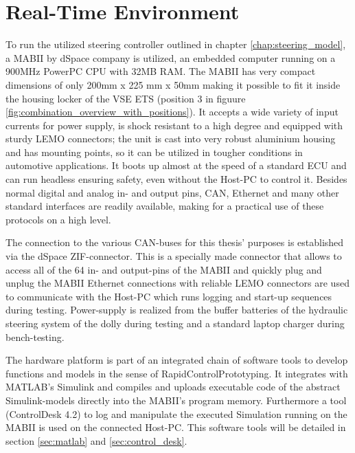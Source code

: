\documentclass[ExampleMasters.tex]{subfiles}
\begin{document}
\section{Real-Time Environment}
\label{sec:realtime_environment}

To run the utilized steering controller outlined in chapter \ref{chap:steering_model}, a \gls{MABII} by dSpace company is utilized, an embedded computer running on a 900MHz PowerPC CPU with 32MB RAM. The \gls{MABII} has very compact dimensions of only 200mm x 225 mm x 50mm making it possible to fit it inside the housing locker of the \gls{VSE} \gls{ETS} (position 3 in figuure \ref{fig:combination_overview_with_positions}). It accepts a wide variety of input currents for power supply, is shock resistant to a high degree and equipped with sturdy \acrshort{LEMO}  connectors; the unit is cast into very robust aluminium housing and has mounting points, so it can be utilized in tougher conditions in automotive applications. It boots up almost at the speed of a standard \gls{ECU} and can run headless ensuring safety, even without the Host-PC to control it. Besides normal digital and analog in- and output pins, CAN, Ethernet and many other standard interfaces are readily available, making for a practical use of these protocols on a high level. 

The connection to the various \gls{CAN}-buses for this thesis' purposes is established via the dSpace \gls{ZIF}-connector. This is a specially made connector that allows to access all of the 64 in- and output-pins of the \gls{MABII} and quickly plug and unplug the \gls{MABII} Ethernet connections with reliable \acrshort{LEMO}  connectors are used to communicate with the Host-PC which runs logging and start-up sequences during testing. Power-supply is realized from the buffer batteries of the hydraulic steering system of the dolly during testing and a standard laptop charger during bench-testing.

The hardware platform is part of an integrated chain of software tools to develop functions and models in the sense of RapidControlPrototyping. It integrates with MATLAB's Simulink and compiles and uploads executable code of the abstract Simulink-models directly into the MABII's program memory. Furthermore a tool (ControlDesk 4.2) to log and manipulate the executed Simulation running on the \gls{MABII} is used on the connected Host-PC. This software tools will be detailed in section \ref{sec:matlab} and \ref{sec:control_desk}.\cite{MABII_product_descr}
\end{document}
